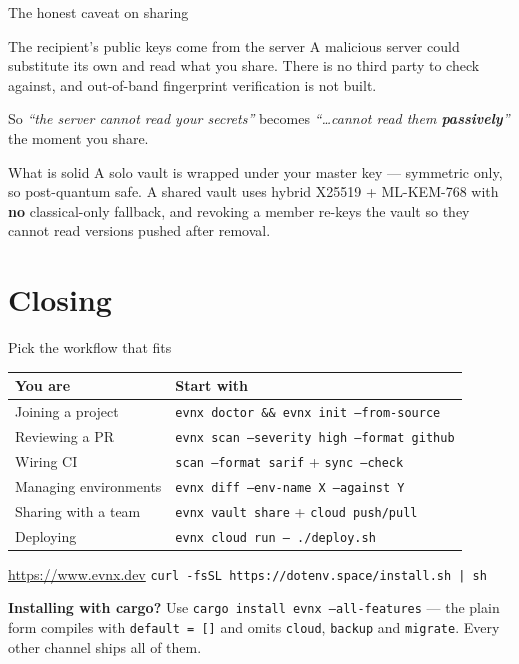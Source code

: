 \documentclass[aspectratio=169,10pt]{beamer}
\begin{document}
\begin{frame}{The honest caveat on sharing}
  \begin{alertblock}{The recipient's public keys come from the server}
    A malicious server could substitute its own and read what you share. There
    is no third party to check against, and out-of-band fingerprint verification
    is not built.
  \end{alertblock}

  \vspace{0.6em}
  So \emph{``the server cannot read your secrets''} becomes \emph{``\ldots cannot
  read them \textbf{passively}''} the moment you share.

  \vspace{0.8em}
  \begin{block}{What is solid}
    A solo vault is wrapped under your master key --- symmetric only, so
    post-quantum safe. A shared vault uses hybrid X25519 + ML-KEM-768 with
    \textbf{no} classical-only fallback, and revoking a member re-keys the
    vault so they cannot read versions pushed after removal.
  \end{block}
\end{frame}

\section*{Closing}
\begin{frame}{Pick the workflow that fits}
  \begin{tabular}{@{}p{}p{}@{}}
    \toprule
    \textbf{You are} & \textbf{Start with} \\
    \midrule
    Joining a project      & \texttt{evnx doctor \&\& evnx init --from-source} \\
    Reviewing a PR         & \texttt{evnx scan --severity high --format github} \\
    Wiring CI              & \texttt{scan --format sarif} + \texttt{sync --check} \\
    Managing environments  & \texttt{evnx diff --env-name X --against Y} \\
    Sharing with a team    & \texttt{evnx vault share} + \texttt{cloud push/pull} \\
    Deploying              & \texttt{evnx cloud run -- ./deploy.sh} \\
    \bottomrule
  \end{tabular}

  \vspace{1em}
  \begin{center}
  \url{https://www.evnx.dev} \quad\textperiodcentered\quad
  \texttt{curl -fsSL https://dotenv.space/install.sh | sh}
  \end{center}

  \vspace{0.6em}
  {\footnotesize \textbf{Installing with cargo?} Use
  \texttt{cargo install evnx --all-features} --- the plain form compiles with
  \texttt{default = []} and omits \texttt{cloud}, \texttt{backup} and
  \texttt{migrate}. Every other channel ships all of them.}
\end{frame}
\end{document}
